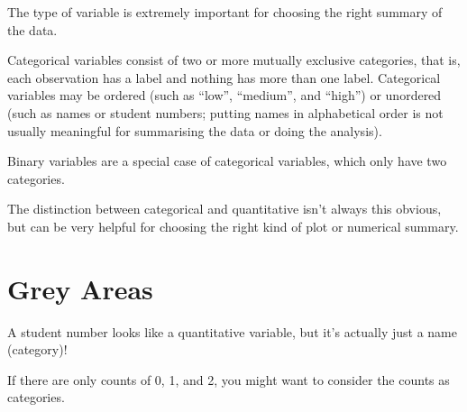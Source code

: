 \documentclass[
  letterpaper,
  DIV=11,
  numbers=noendperiod]{scrreprt}
\begin{document}
The type of variable is extremely important for choosing the right
summary of the data.

Categorical variables consist of two or more mutually exclusive
categories, that is, each observation has a label and nothing has more
than one label. Categorical variables may be ordered (such as ``low'',
``medium'', and ``high'') or unordered (such as names or student
numbers; putting names in alphabetical order is not usually meaningful
for summarising the data or doing the analysis).

Binary variables are a special case of categorical variables, which only
have two categories.

The distinction between categorical and quantitative isn't always this
obvious, but can be very helpful for choosing the right kind of plot or
numerical summary.

\hypertarget{grey-areas}{%
\section{Grey Areas}\label{grey-areas}}

\begin{tcolorbox}[enhanced jigsaw, opacitybacktitle=0.6, left=2mm, colbacktitle=quarto-callout-warning-color!10!white, colframe=quarto-callout-warning-color-frame, breakable, toptitle=1mm, title=\textcolor{quarto-callout-warning-color}{\faExclamationTriangle}\hspace{0.5em}{Student Numbers}, opacityback=0, bottomrule=.15mm, toprule=.15mm, arc=.35mm, leftrule=.75mm, titlerule=0mm, bottomtitle=1mm, colback=white, rightrule=.15mm, coltitle=black]

A student number looks like a quantitative variable, but it's actually
just a name (category)!

\end{tcolorbox}

\pspace

\begin{tcolorbox}[enhanced jigsaw, opacitybacktitle=0.6, left=2mm, colbacktitle=quarto-callout-warning-color!10!white, colframe=quarto-callout-warning-color-frame, breakable, toptitle=1mm, title=\textcolor{quarto-callout-warning-color}{\faExclamationTriangle}\hspace{0.5em}{Number of Children}, opacityback=0, bottomrule=.15mm, toprule=.15mm, arc=.35mm, leftrule=.75mm, titlerule=0mm, bottomtitle=1mm, colback=white, rightrule=.15mm, coltitle=black]

If there are only counts of 0, 1, and 2, you might want to consider the
counts as categories.

\end{tcolorbox}
\end{document}
